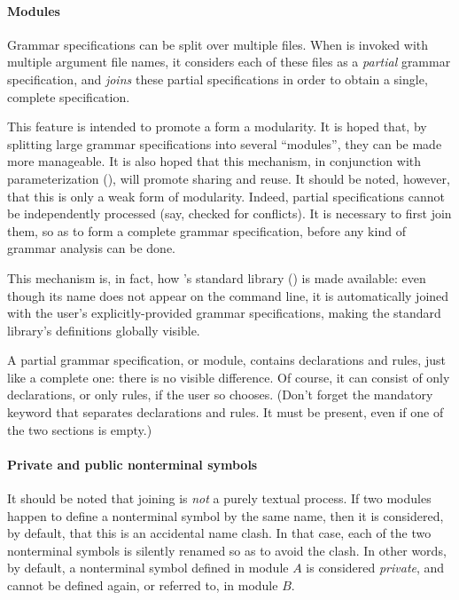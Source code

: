 \documentclass[onecolumn,11pt,nocopyrightspace,preprint]{sigplanconf}
\begin{document}
\paragraph{Modules}

Grammar specifications can be split over multiple files. When \menhir is
invoked with multiple argument file names, it considers each of these files as
a \emph{partial} grammar specification, and \emph{joins} these partial
specifications in order to obtain a single, complete specification.

This feature is intended to promote a form a modularity. It is hoped that, by
splitting large grammar specifications into several ``modules'', they can be
made more manageable. It is also hoped that this mechanism, in conjunction
with parameterization (), will promote sharing and reuse.
It should be noted, however, that this is only a weak form of
modularity. Indeed, partial specifications cannot be independently processed
(say, checked for conflicts).  It is necessary to first join them, so as to
form a complete grammar specification, before any kind of grammar analysis can
be done.

This mechanism is, in fact, how \menhir's standard library ()
is made available: even though its name does not appear on the command line,
it is automatically joined with the user's explicitly-provided grammar
specifications, making the standard library's definitions globally visible.

A partial grammar specification, or module, contains declarations and rules,
just like a complete one: there is no visible difference. Of course, it can
consist of only declarations, or only rules, if the user so chooses. (Don't
forget the mandatory \percentpercent keyword that separates declarations and
rules. It must be present, even if one of the two sections is empty.)

\paragraph{Private and public nonterminal symbols}

It should be noted that joining is \emph{not} a purely textual process. If two
modules happen to define a nonterminal symbol by the same name, then it is
considered, by default, that this is an accidental name clash. In that case,
each of the two nonterminal symbols is silently renamed so as to avoid the
clash. In other words, by default, a nonterminal symbol defined in module $A$
is considered \emph{private}, and cannot be defined again, or referred to, in
module $B$.
\end{document}
